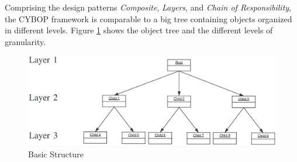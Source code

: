 Comprising the design patterns \emph{Composite}, \emph{Layers}, and
\emph{Chain of Responsibility}, the CYBOP framework is comparable to a big tree
containing objects organized in different levels. Figure \ref{basic_structure_figure}
shows the object tree and the different levels of granularity.

\begin{figure}[ht]
    \begin{center}
       \includegraphics[scale=0.3]{eps/framework-structure.eps}
       \caption{Basic Structure}
       \label{basic_structure_figure}
    \end{center}
\end{figure}

